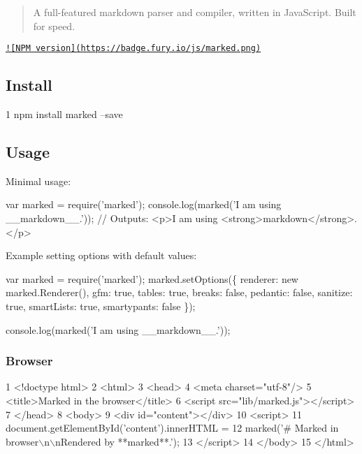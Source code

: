 \begin{quote}
A full-\/featured markdown parser and compiler, written in Java\+Script. Built for speed. \end{quote}


\href{http://badge.fury.io/js/marked}{\tt !\mbox{[}N\+P\+M version\mbox{]}(https\+://badge.\+fury.\+io/js/marked.\+png)}

\subsection*{Install}


\begin{DoxyCode}
1 npm install marked --save
\end{DoxyCode}


\subsection*{Usage}

Minimal usage\+:


\begin{DoxyCode}
var marked = require(\textcolor{stringliteral}{'marked'});
console.log(marked(\textcolor{stringliteral}{'I am using \_\_markdown\_\_.'}));
\textcolor{comment}{// Outputs: <p>I am using <strong>markdown</strong>.</p>}
\end{DoxyCode}


Example setting options with default values\+:


\begin{DoxyCode}
var marked = require(\textcolor{stringliteral}{'marked'});
marked.setOptions(\{
  renderer: \textcolor{keyword}{new} marked.Renderer(),
  gfm: \textcolor{keyword}{true},
  tables: \textcolor{keyword}{true},
  breaks: \textcolor{keyword}{false},
  pedantic: \textcolor{keyword}{false},
  sanitize: \textcolor{keyword}{true},
  smartLists: \textcolor{keyword}{true},
  smartypants: \textcolor{keyword}{false}
\});

console.log(marked(\textcolor{stringliteral}{'I am using \_\_markdown\_\_.'}));
\end{DoxyCode}


\subsubsection*{Browser}


\begin{DoxyCode}
1 <!doctype html>
2 <html>
3 <head>
4   <meta charset="utf-8"/>
5   <title>Marked in the browser</title>
6   <script src="lib/marked.js"></script>
7 </head>
8 <body>
9   <div id="content"></div>
10   <script>
11     document.getElementById('content').innerHTML =
12       marked('# Marked in browser\(\backslash\)n\(\backslash\)nRendered by **marked**.');
13   </script>
14 </body>
15 </html>
\end{DoxyCode}



